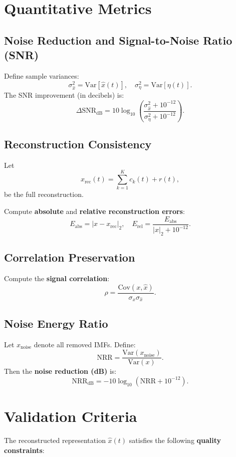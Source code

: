 \documentclass[11pt]{article}
\begin{document}
\section{Quantitative Metrics}

\subsection{Noise Reduction and Signal-to-Noise Ratio (SNR)}
Define sample variances:
\[
\sigma^2_{\hat{x}} = \mathrm{Var}[\hat{x}(t)],
\quad
\sigma^2_{\eta} = \mathrm{Var}[\eta(t)].
\]
The SNR improvement (in decibels) is:
\[
\Delta \mathrm{SNR}_{\text{dB}} = 10 \log_{10}\left( \frac{\sigma^2_{\hat{x}} + 10^{-12}}{\sigma^2_{\eta} + 10^{-12}} \right).
\]

\subsection{Reconstruction Consistency}
Let
\[
x_{\text{rec}}(t) = \sum_{k=1}^{K} c_k(t) + r(t),
\]
be the full reconstruction.

Compute \textbf{absolute} and \textbf{relative reconstruction errors}:
\[
E_{\text{abs}} = |x - x_{\text{rec}}|_2, \quad
E_{\text{rel}} = \frac{E_{\text{abs}}}{|x|_2 + 10^{-12}}.
\]

\subsection{Correlation Preservation}
Compute the \textbf{signal correlation}:
\[
\rho = \frac{\mathrm{Cov}(x, \hat{x})}{\sigma_x \sigma_{\hat{x}}}.
\]

\subsection{Noise Energy Ratio}
Let $x_{\text{noise}}$ denote all removed IMFs. Define:
\[
\mathrm{NRR} = \frac{\mathrm{Var}(x_{\text{noise}})}{\mathrm{Var}(x)}.
\]
Then the \textbf{noise reduction (dB)} is:
\[
\mathrm{NRR}_{\text{dB}} = -10 \log_{10}(\mathrm{NRR} + 10^{-12}).
\]



\section{Validation Criteria}
The reconstructed representation $\hat{x}(t)$ satisfies the following \textbf{quality constraints}:
\end{document}
